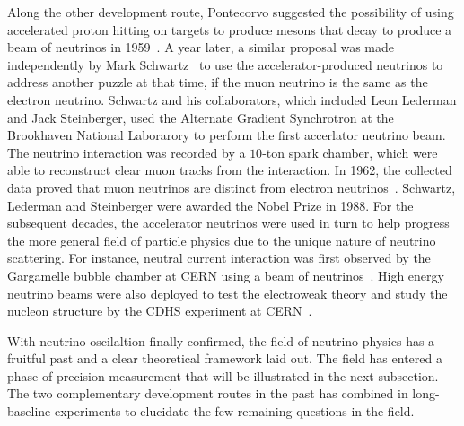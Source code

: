 Along the other development route, Pontecorvo suggested the possibility of using accelerated proton hitting on targets to produce mesons that decay to produce a beam of neutrinos in 1959~\cite{Pontecorvo:1959sn}.
A year later, a similar proposal was made independently by Mark Schwartz~\cite{Schwartz:1960hg} to use the accelerator-produced neutrinos to address another puzzle at that time, if the muon neutrino is the same as the electron neutrino.
Schwartz and his collaborators, which included Leon Lederman and Jack Steinberger, used the Alternate Gradient Synchrotron at the Brookhaven National Laborarory to perform the first accerlator neutrino beam. 
The neutrino interaction was recorded by a $10$-ton spark chamber, which were able to reconstruct clear muon tracks from the interaction.
In 1962, the collected data proved that muon neutrinos are distinct from electron neutrinos~\cite{Danby:1962nd}.
Schwartz, Lederman and Steinberger were awarded the Nobel Prize in 1988.
For the subsequent decades, the accelerator neutrinos were used in turn to help progress the more general field of particle physics due to the unique nature of neutrino scattering.
For instance, neutral current interaction was first observed by the Gargamelle bubble chamber at CERN using a beam of neutrinos~\cite{GargamelleNeutrino:1973jyy}.
High energy neutrino beams were also deployed to test the electroweak theory and study the nucleon structure by the CDHS experiment at CERN~\cite{Schlatter:2015nxk}.

With neutrino oscilaltion finally confirmed, the field of neutrino physics has a fruitful past and a clear theoretical framework laid out.
The field has entered a phase of precision measurement that will be illustrated in the next subsection.
The two complementary development routes in the past has combined in long-baseline experiments to elucidate the few remaining questions in the field.



